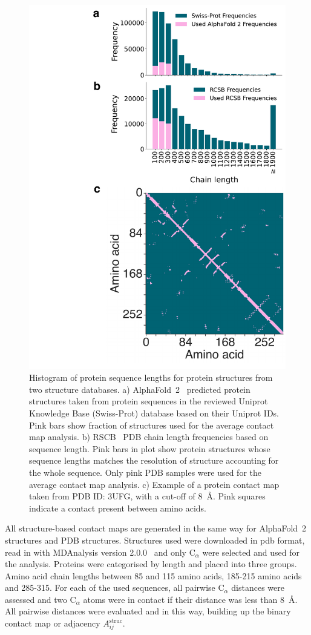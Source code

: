 \documentclass[
reprint,
twocolumn,
amsmath,amssymb,superscriptaddress,aps,
pre]{revtex4-1}
\begin{document}
 \begin{figure}[t]
        \centering
	\includegraphics[width=0.8\columnwidth]{paper/figures/Fig2/Fig2.pdf}
	    \caption{Histogram of protein sequence lengths for protein structures from two structure databases. a) AlphaFold~2~\cite{jumper2021highly} predicted protein structures taken from protein sequences in the reviewed Uniprot Knowledge Base (Swiss-Prot) database based on their Uniprot IDs. Pink bars show fraction of structures used for the average contact map analysis.  b) RSCB~\cite{PDB} PDB chain length frequencies based on sequence length. Pink bars in plot show protein structures whose sequence lengths matches the resolution of structure accounting for the whole sequence. Only pink PDB samples were used for the average contact map analysis. c) Example of a protein contact map taken from PDB ID: 3UFG, with a cut-off of 8~Å. Pink squares indicate a contact present between amino acids.}
        \label{fig:pdb_stats}
\end{figure}
All structure-based contact maps are generated in the same way for AlphaFold~2 structures and PDB structures. Structures used were downloaded in pdb format, read in with MDAnalysis version 2.0.0~\cite{gowers2016mdanalysis} and only C$_{\alpha}$ were selected and used for the analysis. Proteins were categorised by length and placed into three groups. Amino acid chain lengths between 85 and 115 amino acids, 185-215 amino acids and 285-315. For each of the used sequences, all pairwise C$_{\alpha}$ distances were assessed and two C$_{\alpha}$ atoms were in contact if their distance was less than 8~Å. All pairwise distances were evaluated and in this way, building up the binary contact map or adjacency $A_{ij}^{\mathrm{struc}}$.  
\end{document}
